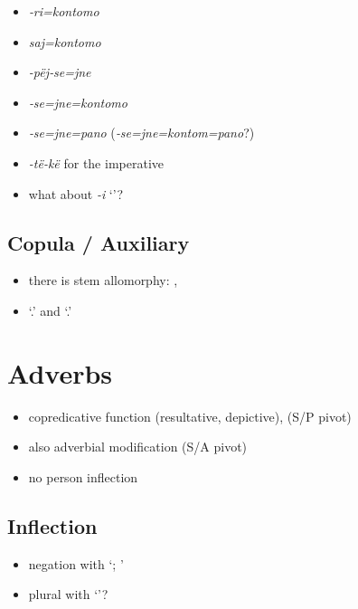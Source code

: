 \documentclass{memoir}
\begin{document}
\begin{itemize}
\tightlist
\item
  \emph{‑ri=kontomo}
\item
  \emph{saj=kontomo}
\item
  \emph{-pëj‑se=jne}
\item
  \emph{‑se=jne=kontomo}
\item
  \emph{‑se=jne=pano} (\emph{‑se=jne=kontom=pano}?)
\item
  \emph{-të-kë} for the imperative
\item
  what about \emph{-i} `'?
\end{itemize}

\section{Copula / Auxiliary}


\begin{itemize}
\tightlist
\item
  there is stem allomorphy: , 
\item
   `.' and  `.'
\end{itemize}

\chapter{\texorpdfstring{Adverbs \label{adverbs}}{Adverbs }}

\begin{itemize}
\item
  copredicative function (resultative, depictive), (S/P pivot)
\item
  also adverbial modification (S/A pivot)
\item
  no person inflection
\end{itemize}

\section{\texorpdfstring{Inflection
\label{sec:adverbinfl}}{Inflection }}

\begin{itemize}
\tightlist
\item
  negation with  `; '
\item
  plural with  `'?
\end{itemize}
\end{document}
